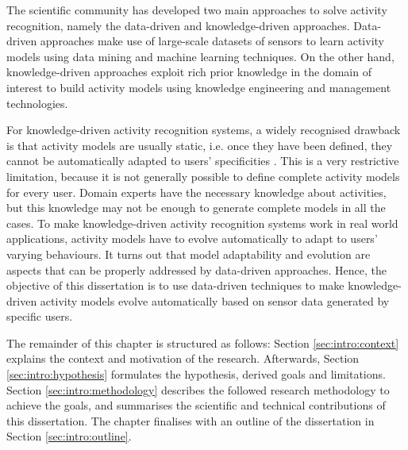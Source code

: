 
The scientific community has developed two main approaches to solve activity recognition, namely the data-driven and knowledge-driven approaches. Data-driven approaches make use of large-scale datasets of sensors to learn activity models using data mining and machine learning techniques. On the other hand, knowledge-driven approaches exploit rich prior knowledge in the domain of interest to build activity models using knowledge engineering and management technologies.


For knowledge-driven activity recognition systems, a widely recognised drawback is that activity models are usually static, i.e. once they have been defined, they cannot be automatically adapted to users' specificities \citep{Chen2014}. This is a very restrictive limitation, because it is not generally possible to define complete activity models for every user. Domain experts have the necessary knowledge about activities, but this knowledge may not be enough to generate complete models in all the cases. To make knowledge-driven activity recognition systems work in real world applications, activity models have to evolve automatically to adapt to users' varying behaviours. It turns out that model adaptability and evolution are aspects that can be properly addressed by data-driven approaches. Hence, the objective of this dissertation is to use data-driven techniques to make knowledge-driven activity models evolve automatically based on sensor data generated by specific users.


The remainder of this chapter is structured as follows: Section \ref{sec:intro:context} explains the context and motivation of the research. Afterwards, Section \ref{sec:intro:hypothesis} formulates the hypothesis, derived goals and limitations. Section \ref{sec:intro:methodology} describes the followed research methodology to achieve the goals, and  summarises the scientific and technical contributions of this dissertation. The chapter finalises with an outline of the dissertation in Section \ref{sec:intro:outline}.



